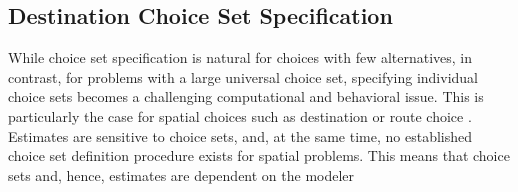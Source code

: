 \subsection{Destination Choice Set Specification}
While choice set specification is natural for choices with few alternatives, in contrast, for problems with a large universal choice set, specifying individual choice sets becomes a challenging computational and
behavioral issue.  This is particularly the case for spatial choices such as destination or route choice \citep[e.g.,][]{PagliaraTimmermans_TransLett_2009, Thill_PHG_1992, Schuessler_PhDThesis_2010, FrejingerEtAl_TransResB_2009}. 
Estimates are sensitive to choice sets, and, at the same time, no established choice set definition procedure exists for spatial problems. 
This means that choice sets and, hence, estimates are 
dependent on the modeler

